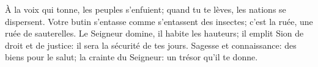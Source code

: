 À la voix qui tonne, les peuples s’enfuient;
	quand tu te lèves, les nations se dispersent.
Votre butin s’entasse comme s’entassent des insectes;
	c’est la ruée, une ruée de sauterelles.
Le Seigneur domine, il habite les hauteurs;
	il emplit Sion de droit et de justice:
	il sera la sécurité de tes jours.
Sagesse et connaissance: des biens pour le salut;
	la crainte du Seigneur: un trésor qu’il te donne.
